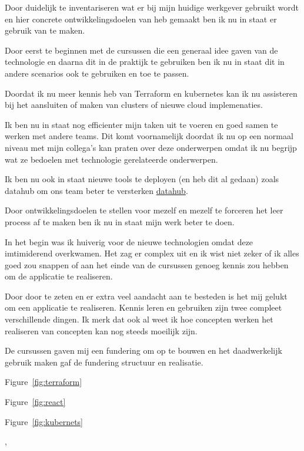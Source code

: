 {{{		}
		{%
			Door duidelijk te inventariseren wat er bij mijn huidige werkgever gebruikt wordt en hier concrete ontwikkelingsdoelen van heb gemaakt ben ik nu in staat er gebruik van te maken.

			Door eerst te beginnen met de cursussen die een generaal idee gaven van de technologie en daarna dit in de praktijk te gebruiken ben ik nu in staat dit in andere scenarios ook te gebruiken en toe te passen.

			Doordat ik nu meer kennis heb van Terraform en kubernetes kan ik nu assisteren bij het aansluiten of maken van clusters of nieuwe cloud implemenaties.

			Ik ben nu in staat nog efficienter mijn taken uit te voeren en goed samen te werken met andere teams.
			Dit komt voornamelijk doordat ik nu op een normaal niveau met mijn collega's kan praten over deze onderwerpen omdat ik nu begrijp wat ze bedoelen met technologie gerelateerde onderwerpen.

			Ik ben nu ook in staat nieuwe tools te deployen (en heb dit al gedaan) zoals datahub om ons team beter te versterken \href{https://datahubproject.io/}{datahub}.

		}
		{%
			Door ontwikkelingsdoelen te stellen voor mezelf en mezelf te forceren het leer process af te maken ben ik nu in staat mijn werk beter te doen.

			In het begin was ik huiverig voor de nieuwe technologien omdat deze imtimiderend overkwamen.
			Het zag er complex uit en ik wist niet zeker of ik alles goed zou snappen of aan het einde van de cursussen genoeg kennis zou hebben om de applicatie te realiseren.

			Door door te zeten en er extra veel aandacht aan te besteden is het mij gelukt om een applicatie te realiseren.
			Kennis leren en gebruiken zijn twee compleet verschillende dingen.
			Ik merk dat ook al weet ik hoe concepten werken het realiseren van concepten kan nog steeds moeilijk zijn.

			De cursussen gaven mij een fundering om op te bouwen en het daadwerkelijk gebruik maken gaf de fundering structuur en realisatie.
		}
		{


		}
	}
	{%

		Figure~\ref{fig:terraform}

		Figure~\ref{fig:react}

		Figure~\ref{fig:kubernets}
	},
}
